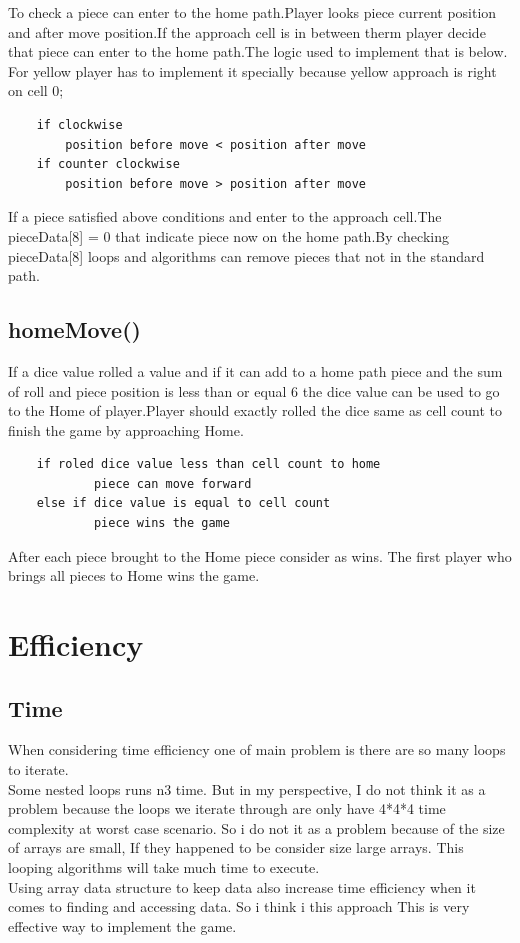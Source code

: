 \documentclass{article}
\begin{document}
To check a piece can enter to the home path.Player looks piece current position and after move position.If the approach cell is in between therm player decide that piece can enter to the home path.The logic used to implement that is below. For yellow player has to implement it specially because yellow approach is right on cell 0;
\begin{verbatim}
    if clockwise
        position before move < position after move
    if counter clockwise
        position before move > position after move
\end{verbatim}

If a piece satisfied above conditions and enter to the approach cell.The pieceData[8] = 0 that indicate piece now on the home path.By checking pieceData[8] loops and algorithms can remove pieces that not in the standard path.

\subsection{homeMove()}
If a dice value rolled a value and if it can add to a home path piece and the sum of roll and piece position is less than or equal 6 the dice value can be used to go to the Home of player.Player should exactly rolled the dice same as cell count to finish the game by approaching Home.
\begin{verbatim}
    if roled dice value less than cell count to home
            piece can move forward
    else if dice value is equal to cell count
            piece wins the game
\end{verbatim}
After each piece brought to the Home piece consider as wins. The first player who brings all pieces to Home wins the game.

\section{Efficiency}
\subsection{Time}
When considering time efficiency one of main problem is there are so many loops to iterate.\\
Some nested loops runs n3 time. But in my perspective, I do not think it as a problem because the loops we iterate through are only have 4*4*4 time complexity at worst case scenario. So i do not it as a problem because of the size of arrays are small, If they happened to be consider size large arrays. This looping algorithms will take much time to execute.\\
Using array data structure to keep data also increase time efficiency when it comes to finding and accessing data. 
So i think i this approach This is very effective way to implement the game.
\end{document}
